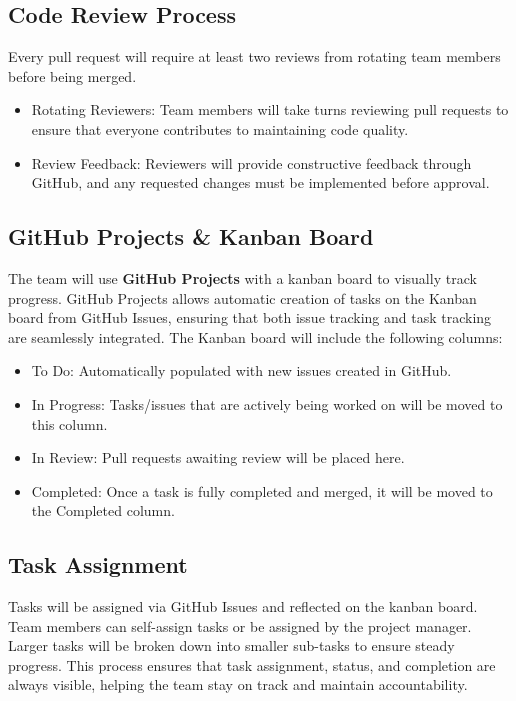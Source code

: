 \documentclass{article}
\begin{document}
\subsection{Code Review Process}
Every pull request will require at least two reviews from rotating team members before being merged.
\begin{itemize}
    \item Rotating Reviewers: Team members will take turns reviewing pull requests to ensure that everyone contributes to maintaining code quality.
    \item Review Feedback: Reviewers will provide constructive feedback through GitHub, and any requested changes must be implemented before approval.
\end{itemize}

\subsection{GitHub Projects \& Kanban Board}
The team will use \textbf{GitHub Projects} with a kanban board to visually track progress. GitHub Projects allows automatic creation of tasks on the Kanban board from GitHub Issues, ensuring that both issue tracking and task tracking are seamlessly integrated. The Kanban board will include the following columns:
\begin{itemize}
    \item To Do: Automatically populated with new issues created in GitHub.
    \item In Progress: Tasks/issues that are actively being worked on will be moved to this column.
    \item In Review: Pull requests awaiting review will be placed here.
    \item Completed: Once a task is fully completed and merged, it will be moved to the Completed column.
\end{itemize}

\subsection{Task Assignment}
Tasks will be assigned via GitHub Issues and reflected on the kanban board. Team members can self-assign tasks or be assigned by the project manager. Larger tasks will be broken down into smaller sub-tasks to ensure steady progress. This process ensures that task assignment, status, and completion are always visible, helping the team stay on track and maintain accountability.
\end{document}
